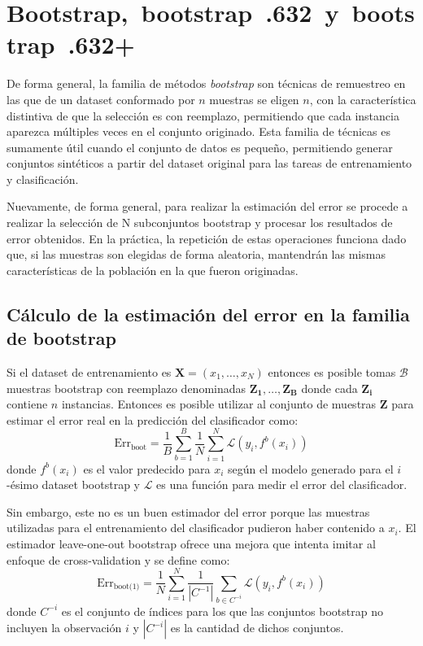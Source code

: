 \documentclass{article}
\begin{document}
\section{Bootstrap, bootstrap .632 y bootstrap .632+}
De forma general, la familia de métodos \emph{bootstrap} son técnicas de remuestreo en las que de un dataset conformado por $n$ muestras se eligen $n$, con la característica distintiva de que la selección es con reemplazo, permitiendo que cada instancia aparezca múltiples veces en el conjunto originado.
Esta familia de técnicas es sumamente útil cuando el conjunto de datos es pequeño, permitiendo generar conjuntos sintéticos a partir del dataset original para las tareas de entrenamiento y clasificación.

Nuevamente, de forma general, para realizar la estimación del error se procede a realizar la selección de N subconjuntos bootstrap y procesar los resultados de error obtenidos.
En la práctica, la repetición de estas operaciones funciona dado que, si las muestras son elegidas de forma aleatoria, mantendrán las mismas características de la población en la que fueron originadas.

\subsection{Cálculo de la estimación del error en la familia de bootstrap} 
Si el dataset de entrenamiento es $\mathbf{X} = (x_1,\ldots,x_N)$ entonces es posible tomas $\mathcal{B}$ muestras bootstrap con reemplazo denominadas $\mathbf{Z_1}, \ldots, \mathbf{Z_B}$ donde cada $\mathbf{Z_i}$ contiene $n$ instancias.
Entonces es posible utilizar al conjunto de muestras $\mathbf{Z}$ para estimar el error real en la predicción del clasificador como:
$$
\text{Err}_{\text{boot}} = \frac{1}{B} \sum_{b=1}^{B} \frac{1}{N} \sum_{i=1}^{N} \mathcal{L}(y_i, f^b(x_i))
$$
donde $f^b(x_i)$ es el valor predecido para $x_i$ según el modelo generado para el $i$-ésimo dataset bootstrap y $\mathcal{L}$ es una función para medir el error del clasificador.

Sin embargo, este no es un buen estimador del error porque las muestras utilizadas para el entrenamiento del clasificador pudieron haber contenido a $x_i$.
El estimador leave-one-out bootstrap ofrece una mejora que intenta imitar al enfoque de cross-validation y se define como:
$$
\text{Err}_{\text{boot(1)}} = \frac{1}{N} \sum_{i=1}^N \frac{1}{|C^{-1}|} \sum_{b \in C^{-i}} \mathcal{L}(y_i, f^b(x_i))
$$
donde $C^{-i}$ es el conjunto de índices para los que las conjuntos bootstrap no incluyen la observación $i$ y $|C^{-i}|$ es la cantidad de dichos conjuntos.
\end{document}
